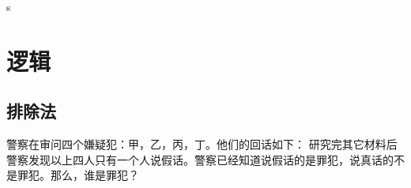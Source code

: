 s
\chapter{逻辑}
\label{chap:logic}
\def\BKC{\cellcolor{gray!50}}   %

\section{排除法}
\begin{example}
  警察在审问四个嫌疑犯：甲，乙，丙，丁。他们的回话如下：
  研究完其它材料后警察发现以上四人只有一个人说假话。警察已经知道说假话的是罪犯，说真话的不是罪犯。那么，谁是罪犯？
\end{example}
